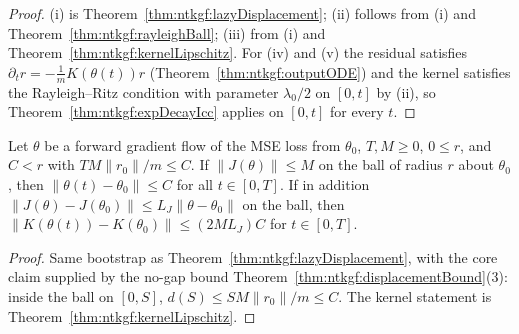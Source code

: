 \begin{proof}
  \leanok
(i) is Theorem~\ref{thm:ntkgf:lazyDisplacement}; (ii) follows from (i) and Theorem~\ref{thm:ntkgf:rayleighBall}; (iii) from (i) and Theorem~\ref{thm:ntkgf:kernelLipschitz}. For (iv) and (v)
the residual satisfies $\partial_tr=-\frac1mK(\theta(t))r$ (Theorem~\ref{thm:ntkgf:outputODE}) and the kernel satisfies the Rayleigh--Ritz condition with parameter $\lambda_0/2$ on $[0,t]$ by (ii), so
Theorem~\ref{thm:ntkgf:expDecayIcc} applies on $[0,t]$ for every $t$.
\end{proof}

\begin{theorem}\label{thm:ntkgf:finiteHorizon}
  \leanok
Let $\theta$ be a forward gradient flow of the MSE loss from $\theta_0$, $T,M\ge0$, $0\le r$, and $C<r$ with $TM\|r_0\|/m\le C$. If $\|J(\theta)\|\le M$ on the ball of radius $r$ about $\theta_0$, then
$\|\theta(t)-\theta_0\|\le C$ for all $t\in[0,T]$. If in addition $\|J(\theta)-J(\theta_0)\|\le L_J\|\theta-\theta_0\|$ on the ball, then $\|K(\theta(t))-K(\theta_0)\|\le(2ML_J)C$ for $t\in[0,T]$.
\end{theorem}

\begin{proof}
  \leanok
Same bootstrap as Theorem~\ref{thm:ntkgf:lazyDisplacement}, with the core claim supplied by the no-gap bound Theorem~\ref{thm:ntkgf:displacementBound}(3): inside the ball on $[0,S]$,
$d(S)\le SM\|r_0\|/m\le C$. The kernel statement is Theorem~\ref{thm:ntkgf:kernelLipschitz}.
\end{proof}


